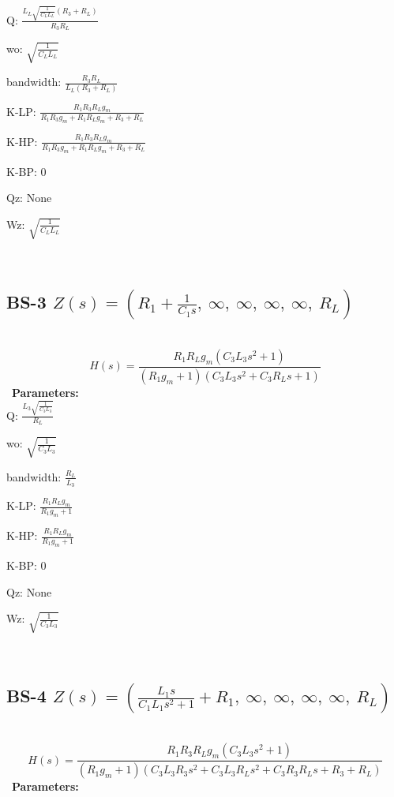 \documentclass{article}
\begin{document}
Q: $\frac{L_{L} \sqrt{\frac{1}{C_{L} L_{L}}} \left(R_{3} + R_{L}\right)}{R_{3} R_{L}}$\ 

wo: $\sqrt{\frac{1}{C_{L} L_{L}}}$\ 

bandwidth: $\frac{R_{3} R_{L}}{L_{L} \left(R_{3} + R_{L}\right)}$\ 

K-LP: $\frac{R_{1} R_{3} R_{L} g_{m}}{R_{1} R_{3} g_{m} + R_{1} R_{L} g_{m} + R_{3} + R_{L}}$\ 

K-HP: $\frac{R_{1} R_{3} R_{L} g_{m}}{R_{1} R_{3} g_{m} + R_{1} R_{L} g_{m} + R_{3} + R_{L}}$\ 

K-BP: $0$\ 

Qz: $\text{None}$\ 

Wz: $\sqrt{\frac{1}{C_{L} L_{L}}}$\ 

\ 

\subsection{BS-3 $Z(s) = \left( R_{1} + \frac{1}{C_{1} s}, \  \infty, \  \infty, \  \infty, \  \infty, \  R_{L}\right)$ } \ 
\textbf{\[H(s) = \frac{R_{1} R_{L} g_{m} \left(C_{3} L_{3} s^{2} + 1\right)}{\left(R_{1} g_{m} + 1\right) \left(C_{3} L_{3} s^{2} + C_{3} R_{L} s + 1\right)}\] } \ 
\textbf{Parameters:}\\ 

Q: $\frac{L_{3} \sqrt{\frac{1}{C_{3} L_{3}}}}{R_{L}}$\ 

wo: $\sqrt{\frac{1}{C_{3} L_{3}}}$\ 

bandwidth: $\frac{R_{L}}{L_{3}}$\ 

K-LP: $\frac{R_{1} R_{L} g_{m}}{R_{1} g_{m} + 1}$\ 

K-HP: $\frac{R_{1} R_{L} g_{m}}{R_{1} g_{m} + 1}$\ 

K-BP: $0$\ 

Qz: $\text{None}$\ 

Wz: $\sqrt{\frac{1}{C_{3} L_{3}}}$\ 

\ 

\subsection{BS-4 $Z(s) = \left( \frac{L_{1} s}{C_{1} L_{1} s^{2} + 1} + R_{1}, \  \infty, \  \infty, \  \infty, \  \infty, \  R_{L}\right)$ } \ 
\textbf{\[H(s) = \frac{R_{1} R_{3} R_{L} g_{m} \left(C_{3} L_{3} s^{2} + 1\right)}{\left(R_{1} g_{m} + 1\right) \left(C_{3} L_{3} R_{3} s^{2} + C_{3} L_{3} R_{L} s^{2} + C_{3} R_{3} R_{L} s + R_{3} + R_{L}\right)}\] } \ 
\textbf{Parameters:}\\ 
\end{document}

